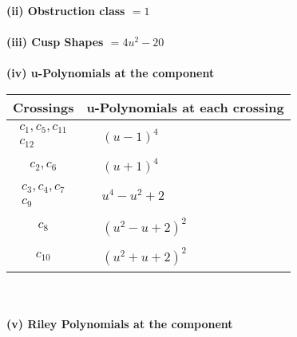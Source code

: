\documentclass[1p]{elsarticle_modified}
\theoremstyle{definition}
\begin{document}
\flushleft \textbf{(ii) Obstruction class $= 1$}\\~\\
\flushleft \textbf{(iii) Cusp Shapes $= 4 u^2-20$}\\~\\
\newpage\renewcommand{\arraystretch}{1}
\flushleft \textbf{(iv) u-Polynomials at the component}\newline \\
\begin{tabular}{m{50pt}|m{274pt}}
Crossings & \hspace{64pt}u-Polynomials at each crossing \\
\hline $$\begin{aligned}c_{1},c_{5},c_{11}\\c_{12}\end{aligned}$$&$\begin{aligned}
&(u-1)^4
\end{aligned}$\\
\hline $$\begin{aligned}c_{2},c_{6}\end{aligned}$$&$\begin{aligned}
&(u+1)^4
\end{aligned}$\\
\hline $$\begin{aligned}c_{3},c_{4},c_{7}\\c_{9}\end{aligned}$$&$\begin{aligned}
&u^4- u^2+2
\end{aligned}$\\
\hline $$\begin{aligned}c_{8}\end{aligned}$$&$\begin{aligned}
&(u^2- u+2)^2
\end{aligned}$\\
\hline $$\begin{aligned}c_{10}\end{aligned}$$&$\begin{aligned}
&(u^2+u+2)^2
\end{aligned}$\\
\hline
\end{tabular}\\~\\
\newpage\renewcommand{\arraystretch}{1}
\flushleft \textbf{(v) Riley Polynomials at the component}\newline \\
\end{document}
